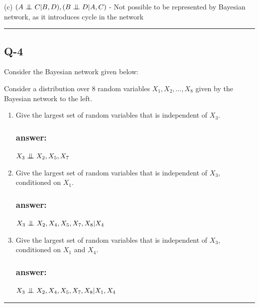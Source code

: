 \documentclass[fleqn]{article}
\newcommand{\bigCI}{\mathrel{\text{\scalebox{1.07}{$\perp\mkern-10mu\perp$}}}}
\begin{document}
(c) $(A \bigCI C | B, D), (B \bigCI D | A, C)$ - Not possible to be represented by Bayesian network, as it introduces cycle in the network


\noindent\rule{\textwidth}{1pt}
\subsection*{Q-4}

Consider the Bayesian network given below:

Consider a distribution over 8 random variables $X_1, X_2, \dots, X_8$ given by the Bayesian network to the left.

\begin{enumerate}
  \item Give the largest set of random variables that is independent of $X_3$. 
  \subsubsection*{answer:} $X_3 \bigCI X_2, X_5, X_7$
  \item Give the largest set of random variables that is independent of $X_3$, conditioned on $X_1$.
  \subsubsection*{answer:} $X_3 \bigCI X_2, X_4, X_5, X_7, X_8 | X_4$
  \item Give the largest set of random variables that is independent of $X_3$, conditioned on $X_1$ and $X_4$.
  \subsubsection*{answer:} $X_3 \bigCI X_2, X_4, X_5, X_7, X_8 | X_1, X_4$
\end{enumerate}

\noindent\rule{\textwidth}{1pt}
\end{document}
